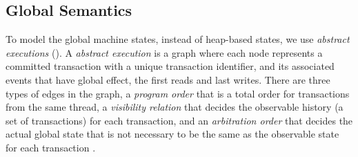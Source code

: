 \subsection{Global Semantics}

To model the global machine states, instead of heap-based states, we use \emph{abstract executions} ().
A \emph{abstract execution} is a graph where each node represents a committed transaction with a unique transaction identifier, and its associated events that have global effect, \ie the first reads and last writes.
There are three types of edges in the graph, a \emph{program order} that is a total order for transactions from the same thread, a \emph{visibility relation} that decides the observable history (a set of transactions) for each transaction, and an \emph{arbitration order} that decides the actual global state that is not necessary to be the same as the observable state for each transaction \cite{eventually-consistent-transactions,Burckhardt:2014:RDT:2535838.2535848,cerone_et_al:LIPIcs:2015:5375}.

